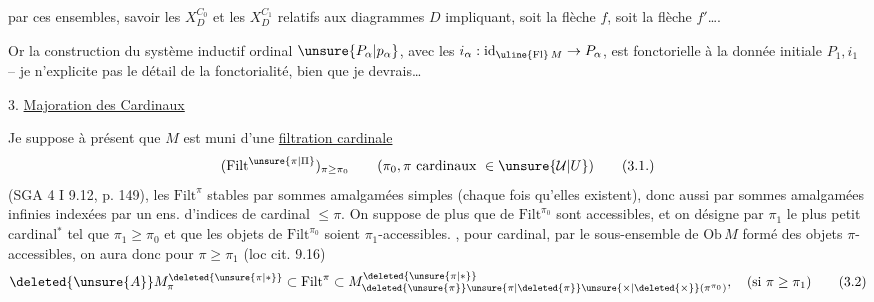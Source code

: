  par ces ensembles, savoir les $X_D^{C_0}$ et les $X_D^{C_1}$ relatifs aux diagrammes $D$ impliquant, soit la flèche $f$, soit la flèche $f'$\ldots.

Or la construction  du système inductif ordinal $\unsure{P_\alpha|p_\alpha}$, avec les $i_\alpha:\mathrm{id}_{\uline{\mathrm{Fl}}\,M}\to P_\alpha$, est fonctorielle  à la donnée initiale $P_1,i_1$ -- je  n'explicite pas le détail de la fonctorialité, bien que je devrais\ldots

3. \uline{Majoration des Cardinaux}

Je suppose à présent que $M$ est muni d'une \uline{filtration cardinale}
\[
(\mathrm{Filt}^{\unsure{\pi|\Pi}})_{\pi\geq\pi_0}\qquad(\pi_0,\pi\text{ cardinaux }\in\unsure{\mathcal U|U})\tag*{(3.1.)}
\]
(SGA 4 I 9.12, p. 149),  les $\mathrm{Filt}^{\pi}$ stables par sommes amalgamées simples (chaque fois qu'elles existent), donc aussi par sommes amalgamées infinies indexées par un ens. d'indices de cardinal $\leq\pi$. On suppose de plus que   de $\mathrm{Filt}^{\pi_0}$ sont accessibles, et  on désigne par \textcircled{$\pi_1$} le plus petit cardinal$^*$ tel que $\pi_1\geq\pi_0$ et que les objets de $\mathrm{Filt}^{\pi_0}$ soient $\pi_1$-accessibles. , pour \deleted{$\unsure{\pi}$}  cardinal, par   le sous-ensemble de $\mathrm{Ob}\,M$ formé des objets $\pi$-accessibles, on aura donc pour  $\pi\geq\pi_1$ (loc cit. 9.16)
\[
\deleted{\unsure{A}}M_{\pi}^{\deleted{\unsure{\pi|*}}}\subset\mathrm{Filt}^{\pi}\subset M_{\deleted{\unsure{\pi}}\unsure{\pi|\deleted{\pi}}\unsure{\times|\deleted{\times}}(\pi^{\pi_0})}^{\deleted{\unsure{\pi|*}}},\quad(\text{si }\pi\geq\pi_1)\tag*{(3.2)}
\]

